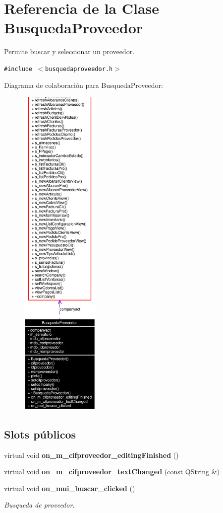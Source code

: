 \section{Referencia de la Clase Busqueda\-Proveedor}
\label{classBusquedaProveedor}
Permite buscar y seleccionar un proveedor.  


{\tt \#include $<$busquedaproveedor.h$>$}

Diagrama de colaboraci\'{o}n para Busqueda\-Proveedor:\begin{figure}[H]
\begin{center}
\leavevmode
\includegraphics[width=109pt]{classBusquedaProveedor__coll__graph}
\end{center}
\end{figure}
\subsection*{Slots p\'{u}blicos}
\begin{CompactItemize}
\item 
virtual void {\bf on\_\-m\_\-cifproveedor\_\-editing\-Finished} ()\label{classBusquedaProveedor_i0}

\item 
virtual void {\bf on\_\-m\_\-cifproveedor\_\-text\-Changed} (const QString \&)\label{classBusquedaProveedor_i1}

\item 
virtual void {\bf on\_\-mui\_\-buscar\_\-clicked} ()
\begin{CompactList}\small\item\em Busqueda de proveedor. \item\end{CompactList}\end{CompactItemize}
